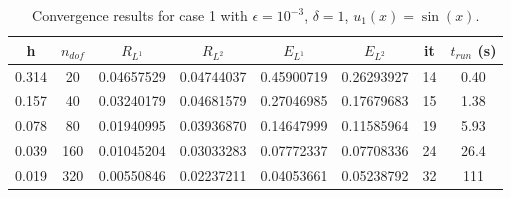 \documentclass[11pt]{amsart}   	%
\theoremstyle{plain}
\numberwithin{equation}{section}
\begin{document}
\begin{table}[H]
    \centering
    \caption{Convergence results for case 1 with $\epsilon=10^{-3}$, $\delta=1$, $u_1(x)=\sin(x)$.}%
    \begin{tabular}{|c|c||c|c||c|c||c|c|}
    \hline
    h & $n_{dof}$ & $R_{L^1}$ & $R_{L^2} $  & $E_{L^1}$ & $E_{L^2}$ & it & $t_{run}$ (s)
    \\ \hline
    0.314 & 20 & 0.04657529 &0.04744037  & 0.45900719 & 0.26293927 & 14 & 0.40
    \\ \hline
    0.157 & 40 & 0.03240179 & 0.04681579 & 0.27046985 & 0.17679683 & 15  &  1.38
    \\ \hline
    0.078 & 80 & 0.01940995 & 0.03936870 & 0.14647999 & 0.11585964 &  19 & 5.93
    \\ \hline
    0.039 & 160 & 0.01045204 & 0.03033283 & 0.07772337 & 0.07708336 & 24 & 26.4  
    \\ \hline
    0.019 & 320 & 0.00550846 & 0.02237211 & 0.04053661 &0.05238792  & 32 & 111 
    \\ \hline  
    \end{tabular}
    \label{tab:num_case_1a}
\end{table}

\end{document}
